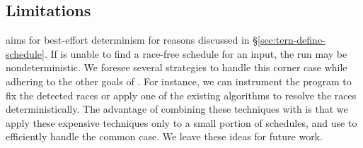 



\subsection{Limitations} \label{sec:tern-limit}


 \tern aims for best-effort determinism for reasons
discussed in \S\ref{sec:tern-define-schedule}.  If \tern is unable to find a
race-free schedule for an input, the run may be nondeterministic.  We
foresee several strategies to handle this corner case while adhering to
the other goals of \tern.  For instance, we can instrument the program to
fix the detected races or apply one of the existing \dmt algorithms to
resolve the races deterministically.  The advantage of combining these
techniques with \tern is that we apply these expensive techniques only to a
small portion of schedules, and use \tern to efficiently handle the common
case.  We leave these ideas for future work.

